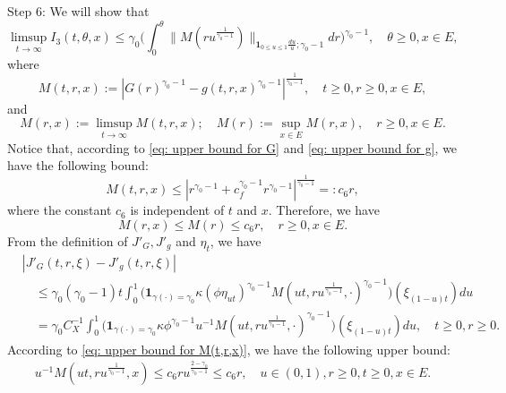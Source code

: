 \documentclass[12pt, a4paper]{amsart}
\theoremstyle{definition}
\numberwithin{equation}{section}
\begin{document}
	Step 6: We will show that
\begin{equation}
	\limsup_{t\to \infty} I_3(t,\theta,x)
	\leq \gamma_0 \Big(  \int_0^\theta  \| M(r u^{\frac{1}{\gamma_0 - 1}}) \|_{\mathbf 1_{0\leq u\leq 1}\frac{du}{u};\gamma_0 - 1}  dr\Big)^{\gamma_0 - 1},
	\quad \theta \geq 0, x\in E,
\end{equation}
	where
\begin{equation}
	M(t,r,x)
	:= |G(r)^{\gamma_0 - 1} - g(t,r,x)^{\gamma_0 - 1}|^{\frac{1}{\gamma_0 - 1}},
	\quad t\geq 0, r\geq 0, x\in E,
\end{equation}
	and
\begin{equation}
	M(r,x)
	:= \limsup_{t\to \infty} M(t,r,x);
	\quad M(r):= \sup_{x\in E} M(r,x),
	\quad r\geq 0, x\in E.
\end{equation}
	Notice that, according to \eqref{eq: upper bound for G} and \eqref{eq: upper bound for g}, we have the following bound:
\begin{equation}\label{eq: upper bound for M(t,r,x)}
	M(t,r,x)
	\leq |r^{\gamma_0 - 1} + c_f^{\gamma_0 - 1} r^{\gamma_0 - 1} | ^{\frac{1}{\gamma_0 - 1}}
	=: c_6 r,
\end{equation}
	where the constant $c_6$ is independent of $t$ and $x$.
	Therefore, we have
\begin{equation}
	M(r,x)
	\leq M(r)
	\leq c_6 r,
	\quad r\geq 0, x\in E.
\end{equation}	
	From the definition of $J'_G, J'_g$ and $\eta_t$, we have
\begin{equation}\label{eq: differences between J'_G and J'_g}\begin{split}
	&|J'_G(t,r,\xi) - J'_g(t,r,\xi)|
	\\&\quad \leq \gamma_0(\gamma_0 - 1) t \int_0^1 \big( \mathbf 1_{\gamma(\cdot) = \gamma_0} \kappa (\phi \eta_{ut})^{\gamma_0 - 1} M(ut,ru^{\frac{1}{\gamma_0 - 1}},\cdot)^{\gamma_0 - 1}\big)(\xi_{(1-u)t}) du
	\\&\quad = \gamma_0 C_X^{-1}\int_0^1 \big( \mathbf 1_{\gamma(\cdot) = \gamma_0} \kappa  \phi^{\gamma_0 - 1}  u^{-1} M(ut,ru^{\frac{1}{\gamma_0 - 1}},\cdot)^{\gamma_0 - 1}\big)(\xi_{(1-u)t}) du,
	\quad t\geq 0, r\geq 0.
\end{split}\end{equation}
	According to \eqref{eq: upper bound for M(t,r,x)}, we have the following upper bound:
\begin{equation}\begin{split}
		u^{-1} M(ut,ru^{\frac{1}{\gamma_0 - 1}}, x)
		\leq c_6 ru^{\frac{2-\gamma_0}{\gamma_0 - 1}}
		\leq c_6 r,
		\quad u\in (0,1), r\geq 0, t\geq 0, x\in E.
\end{split}\end{equation}
\end{document}
